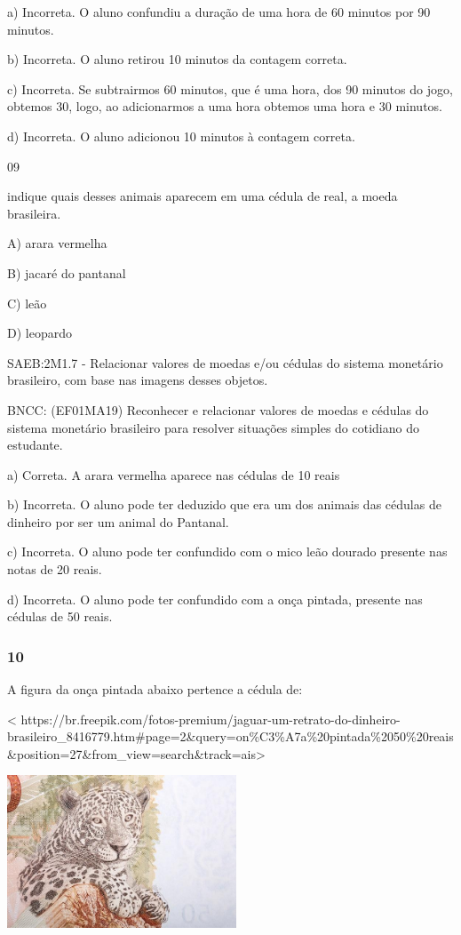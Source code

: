 \begin{itemize}
\begin{itemize}
a) Incorreta. O aluno confundiu a duração de uma hora de 60 minutos por
90 minutos.

b) Incorreta. O aluno retirou 10 minutos da contagem correta.

c) Incorreta. Se subtrairmos 60 minutos, que é uma hora, dos 90 minutos
do jogo, obtemos 30, logo, ao adicionarmos a uma hora obtemos uma hora e
30 minutos.

d) Incorreta. O aluno adicionou 10 minutos à contagem correta.

\num{09}

indique quais desses animais aparecem em uma cédula de real, a moeda
brasileira.

A) arara vermelha

B) jacaré do pantanal

C) leão

D) leopardo

SAEB:2M1.7 - Relacionar valores de moedas e/ou cédulas do sistema
monetário brasileiro, com base nas imagens desses objetos.

BNCC: (EF01MA19) Reconhecer e relacionar valores de moedas e cédulas do
sistema monetário brasileiro para resolver situações simples do
cotidiano do estudante.

a) Correta. A arara vermelha aparece nas cédulas de 10 reais

b) Incorreta. O aluno pode ter deduzido que era um dos animais das
cédulas de dinheiro por ser um animal do Pantanal.

c) Incorreta. O aluno pode ter confundido com o mico leão dourado
presente nas notas de 20 reais.

d) Incorreta. O aluno pode ter confundido com a onça pintada, presente
nas cédulas de 50 reais.

\subsubsection{10 }\label{section-141}

A figura da onça pintada abaixo pertence a cédula de:

\textless{}
https://br.freepik.com/fotos-premium/jaguar-um-retrato-do-dinheiro-brasileiro\_8416779.htm\#page=2\&query=on\%C3\%A7a\%20pintada\%2050\%20reais\&position=27\&from\_view=search\&track=ais\textgreater{}

\includegraphics[width=2.68408in,height=1.78802in]{media/image157.jpg}


\end{itemize}
\end{itemize}
